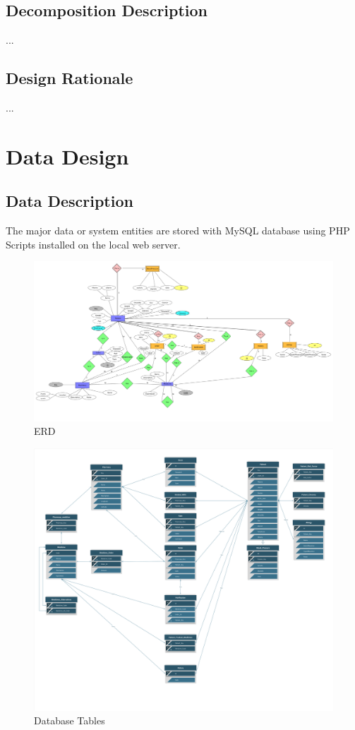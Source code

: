 \documentclass[]{article}
\begin{document}
\subsection{Decomposition Description}
...


\subsection{Design Rationale}
...


\section{Data Design}
\subsection{Data Description}
The major data or system entities are stored with MySQL database using PHP Scripts installed on the local web server.

\begin{figure}[H]

\includegraphics[scale=0.18]{./database/Erd}
\caption{ERD}
\end{figure}

\begin{figure}[H]
\centering
\includegraphics[scale=0.1]{./database/DatabaseTables}
\caption{Database Tables}
\end{figure}
\end{document}

